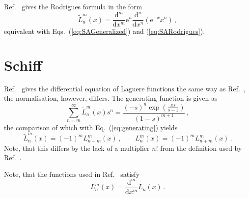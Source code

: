 \documentclass[a4paper,12pt,final]{article}
\def\d{\mathrm{d}}
\def\e{\mathrm{e}}
\begin{document}
Ref.\ \cite{ABohm} gives the Rodrigues formula in the form
\begin{equation}
 \label{eq:SCHRodrigues}
 {\tilde L}_n^m (x) = \frac{\d^m}{\d x^m} \e^n \frac{\d^n}{\d x^n} (\e^{-x}x^n)\,,
\end{equation}
equivalent with Eqs.\ (\ref{eq:SAGeneralized}) and (\ref{eq:SARodrigues}).



\section{Schiff}
Ref.\ \cite{Schiff} gives the differential equation of Laguere functions the same way as Ref.\ \cite{LL}, the normalisation, however, differs. The generating function is given as
\begin{equation}
 \label{eq:SCHgenerating}
 \sum_{n=m}^\infty {\tilde L}_n^m(x) s^n = \frac{(-s)^n \exp\left(\frac{x s}{s-1}\right)}{(1-s)^{m+1}}\,,
\end{equation}
the comparison of which with Eq.\ (\ref{eq:generating}) yields
\begin{equation}
 \label{eq:SCHidentify}
 {\tilde L}_n^m (x) = (-1)^m L_{n-m}^m(x)\,,\quad\quad L_n^m(x) = (-1)^m L_{n+m}^m(x)\,.
\end{equation}
Note, that this differs by the lack of a multiplier $n!$ from the definition used by Ref.\ \cite{LL}.

Note, that the functions used in Ref.\ \cite{Schiff} satisfy
\begin{equation}
 \label{eq:SCHGeneralized}
 L_n^m(x) = \frac{\d^m}{\d x^m} L_n(x)\,.
\end{equation}
\end{document}
